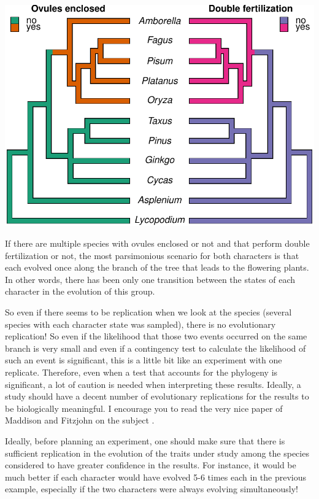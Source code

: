 \documentclass[
]{book}
\begin{document}
\begin{center}\includegraphics{pcm-workshop_files/figure-latex/AngiospermsWithCharacters4-1} \end{center}

If there are multiple species with ovules enclosed or not and that perform double fertilization or not, the most parsimonious scenario for both characters is that each evolved once along the branch of the tree that leads to the flowering plants. In other words, there has been only one transition between the states of each character in the evolution of this group.

So even if there seems to be replication when we look at the species (several species with each character state was sampled), there is no evolutionary replication! So even if the likelihood that those two events occurred on the same branch is very small and even if a contingency test to calculate the likelihood of such an event is significant, this is a little bit like an experiment with one replicate. Therefore, even when a test that accounts for the phylogeny is significant, a lot of caution is needed when interpreting these results. Ideally, a study should have a decent number of evolutionary replications for the results to be biologically meaningful. I encourage you to read the very nice paper of Maddison and Fitzjohn on the subject \citep{maddison2015unsolved}.

Ideally, before planning an experiment, one should make sure that there is sufficient replication in the evolution of the traits under study among the species considered to have greater confidence in the results. For instance, it would be much better if each character would have evolved 5-6 times each in the previous example, especially if the two characters were always evolving simultaneously!
\end{document}
